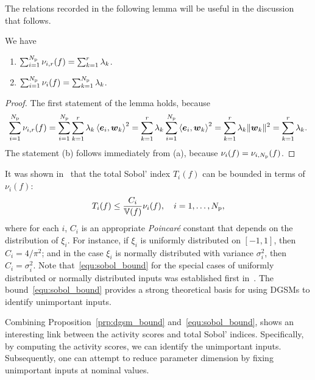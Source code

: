 The relations recorded in the following lemma will be useful in the discussion 
that follows.
\begin{lemma}\label{lem:sum}
We have
\begin{enumerate}[label=(\alph*)]
\item $\sum_{i = 1}^\Np \act{f}{i}{r} = \sum_{k = 1}^r \lambda_k$. 
\item $\sum_{i = 1}^\Np \nu_i(f) = \sum_{k = 1}^\Np \lambda_k$. 
\end{enumerate}
\end{lemma}
\begin{proof}
The first statement of the lemma holds, because
\[
\sum_{i=1}^\Np \act{f}{i}{r}    
= \sum_{i=1}^\Np \sum_{k=1}^r \lambda_k \ip{\vec{e}_i}{\vec{w}_k}^2 
= \sum_{k=1}^r \lambda_k \sum_{i=1}^\Np \ip{\vec{e}_i}{\vec{w}_k}^2 
= \sum_{k=1}^r \lambda_k \| \vec{w}_k \|^2 = \sum_{k=1}^r \lambda_k.
\]
The statement (b) follows immediately from (a), because $\nu_i(f) = \act{f}{i}{\Np}$.
\end{proof}

It was shown in~\cite{Lamboni:2013} that the total Sobol' 
index $T_i(f)$ can be bounded in terms of $\nu_i(f)$:
\begin{equation}\label{equ:sobol_bound}
T_i(f) \leq \frac{C_i}{\V(f)}\nu_i(f), \quad i = 1, \ldots, \Np,
\end{equation}
where for each $i$, $C_i$ is an appropriate \emph{Poincar\'{e}} constant
that depends on the distribution of $\xi_i$.
For instance, if $\xi_i$ is uniformly distributed on $[-1, 1]$, then $C_i = 4/\pi^2$; and in the 
case $\xi_i$ is normally distributed with variance $\sigma_i^2$, then $C_i = \sigma_i^2$. 
Note that~\eqref{equ:sobol_bound} for the special cases of 
uniformly distributed or normally distributed inputs was established first in~\cite{Sobol:2009}.
The bound~\eqref{equ:sobol_bound} provides a strong theoretical basis for using DGSMs to identify 
unimportant inputs. 

Combining Proposition~\ref{prp:dgsm_bound} and~\eqref{equ:sobol_bound}, shows
an interesting link between the activity scores and total Sobol' indices.
Specifically, by computing the activity scores, we can identify the unimportant
inputs.  
Subsequently, 
one can attempt to reduce parameter dimension by fixing
unimportant inputs at nominal values. 

